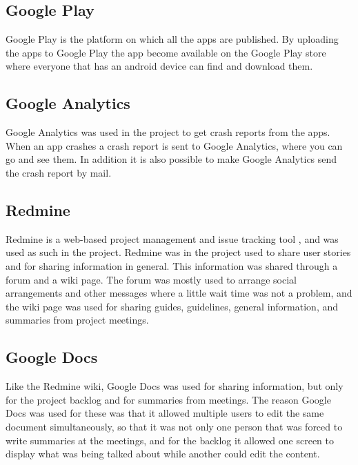 \subsection{Google Play}
Google Play is the platform on which all the apps are published. By uploading the apps to Google Play the app become available on the Google Play store where everyone that has an android device can find and download them.

\subsection{Google Analytics}
Google Analytics was used in the project to get crash reports from the apps. When an app crashes a crash report is sent to Google Analytics, where you can go and see them. In addition it is also possible to make Google Analytics send the crash report by mail.

\subsection{Redmine}
Redmine is a web-based project management and issue tracking tool \citep{Redmine}, and was used as such in the project. Redmine was in the project used to share user stories and for sharing information in general. This information was shared through a forum and a wiki page. The forum was mostly used to arrange social arrangements and other messages where a little wait time was not a problem, and the wiki page was used for sharing guides, guidelines, general information, and summaries from project meetings.

\subsection{Google Docs}
Like the Redmine wiki, Google Docs was used for sharing information, but only for the project backlog and for summaries from meetings. The reason Google Docs was used for these was that it allowed multiple users to edit the same document simultaneously, so that it was not only one person that was forced to write summaries at the meetings, and for the backlog it allowed one screen to display what was being talked about while another could edit the content.